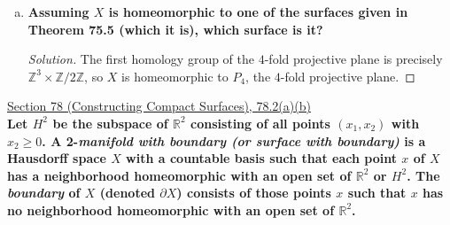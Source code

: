 \documentclass[11pt]{article}
\newcommand{\R}{\mathbb{R}}
\newcommand{\Z}{\mathbb{Z}}
\newenvironment{solution}
  {\renewcommand\qedsymbol{$\blacksquare$}\begin{proof}[Solution]}
  {\end{proof}}
\begin{document}
\begin{enumerate}[a)]
\begin{solution}
    It follows that
    \begin{align*}
        H_1(X) &\cong \frac{[\langle (1, 0, 0, 0) \rangle \times \langle (0, 1, 0, 0) \rangle \times \langle (0, 0, 1, 0) \rangle \times \langle (1, 0, 1, 1) \rangle]}{\langle 2, 0, 2, 2\rangle} \\
        &\cong \langle (1, 0, 0, 0) \rangle \times \langle (0, 1, 0, 0) \rangle \times \langle (0, 0, 1, 0) \rangle \times \Z / 2\Z \\
        &\cong \boxed{\Z^3 \times \Z/2\Z}. \, \qedhere
    \end{align*} 
    \end{solution}
    
    \item \textbf{Assuming $X$ is homeomorphic to one of the surfaces given in Theorem 75.5 (which it is), which surface is it?}
    
    \begin{solution}
    The first homology group of the $4$-fold projective plane is precisely $\Z^3 \times \Z/2\Z$, so $X$ is homeomorphic to $\boxed{P_4}$, the $4$-fold projective plane. 
    \end{solution}
\end{enumerate}
\newpage


\underline{Section 78 (Constructing Compact Surfaces), 78.2(a)(b)} \\

\textbf{Let $H^2$ be the subspace of $\R^2$ consisting of all points $(x_1, x_2)$ with $x_2 \geq 0$. A 2-\textit{manifold with boundary (or surface with boundary)}
is a Hausdorff space $X$ with a countable basis such that each point $x$ of $X$ has a neighborhood homeomorphic with an open set of $\R^2$ or $H^2$.
The \textit{boundary} of $X$ (denoted $\partial X$) consists of those points $x$ such that $x$ has no neighborhood homeomorphic with an open set of $\R^2$.}
\end{document}
